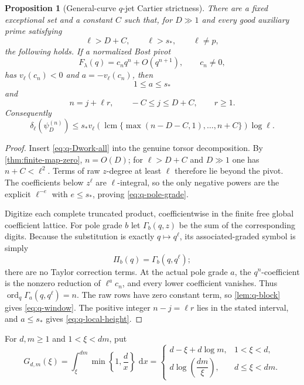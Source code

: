 \documentclass[11pt]{article}
\newtheorem{proposition}[proposition]{Proposition}
\theoremstyle{definition}
\theoremstyle{remark}
\newcommand{\dd}{\,\mathrm d}
\newcommand{\ord}{\operatorname{ord}}
\newcommand{\lcmop}{\operatorname{lcm}}
\begin{document}
\begin{proposition}[General-curve $q$-jet Cartier strictness]
\label{prop:q-jet-Cartier}
There are a fixed exceptional set and a constant $C$ such that, for
$D\gg1$ and every good auxiliary prime satisfying
\[
 \ell>D+C,\qquad \ell>s_*,\qquad \ell\ne p,
\]
the following holds.  If a normalized Bost pivot
\[
 F_\lambda(q)=c_nq^n+O(q^{n+1}),\qquad c_n\ne0,
\]
has $v_\ell(c_n)<0$ and $a=-v_\ell(c_n)$, then
\begin{equation}\label{eq:q-pole-grade}
 1\le a\le s_*
\end{equation}
and
\begin{equation}\label{eq:q-window}
 n=j+\ell r,
 \qquad -C\le j\le D+C,
 \qquad r\ge1.
\end{equation}
Consequently
\begin{equation}\label{eq:q-local-height}
 \delta_\ell(\psi_D^{(n)})
 \le s_*v_\ell\!\left(
 \lcmop\{\max(n-D-C,1),\ldots,n+C\}\right)\log\ell.
\end{equation}
\end{proposition}

\begin{proof}
Insert \eqref{eq:q-Dwork-all} into the genuine torsor decomposition.  By
\cref{thm:finite-map-zero}, $n=O(D)$; for $\ell>D+C$ and $D\gg1$ one has
$n+C<\ell^2$.  Terms of raw $z$-degree at least $\ell$ therefore lie beyond
the pivot.  The coefficients below $z^\ell$ are $\ell$-integral, so the only
negative powers are the explicit $\ell^{-e}$ with $e\le s_*$, proving
\eqref{eq:q-pole-grade}.

Digitize each complete truncated product, coefficientwise in the finite free
global coefficient lattice.  For pole grade $b$ let $\Gamma_b(q,z)$ be the
sum of the corresponding digits.  Because the substitution is exactly
$q\mapsto q^\ell$, its associated-graded symbol is simply
\[
 \Pi_b(q)=\Gamma_b(q,q^\ell);
\]
there are no Taylor correction terms.  At the actual pole grade $a$, the
$q^n$-coefficient is the nonzero reduction of $\ell^ac_n$, and every lower
coefficient vanishes.  Thus $\ord_q\Gamma_a(q,q^\ell)=n$.  The raw rows have
zero constant term, so \cref{lem:q-block} gives
\eqref{eq:q-window}.  The positive integer $n-j=\ell r$ lies in the stated
interval, and $a\le s_*$ gives \eqref{eq:q-local-height}.
\end{proof}

For $d,m\ge1$ and $1<\xi<dm$, put
\begin{equation}\label{eq:Gdm}
 G_{d,m}(\xi)=\int_\xi^{dm}\min\left\{1,\frac d x\right\}\,\dd x
 =\begin{cases}
 d-\xi+d\log m,&1<\xi<d,\\[1mm]
 d\log\!\left(\dfrac{dm}{\xi}\right),&d\le\xi<dm.
 \end{cases}
\end{equation}
\end{document}
